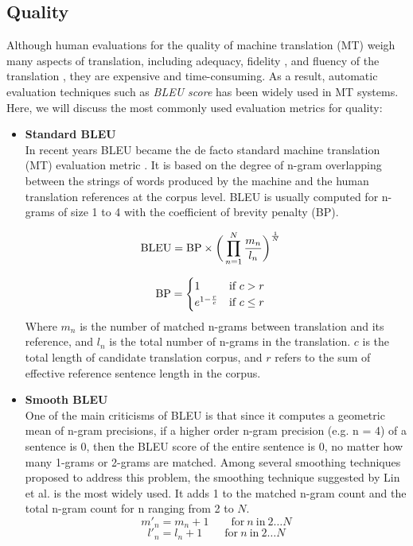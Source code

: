 \documentclass{sfuthesis}
\begin{document}
\subsection{Quality} \label{subsec:quality}
Although human evaluations for the quality of machine translation (MT) weigh many aspects of translation, including adequacy, fidelity , and fluency of the translation \cite{hovy:1999:toward}, they are expensive and time-consuming. As a result, automatic evaluation techniques such as \emph{BLEU score} \cite{Papineni:2002:ACL} has been widely used in MT systems. Here, we will discuss the most commonly used evaluation metrics for quality:\\
\begin{itemize}
    \item \textbf{ Standard BLEU}\\
    In recent years BLEU became the de facto standard machine translation (MT) evaluation metric \cite{chen:2014:ACL}. It is based on the degree of n-gram overlapping between the strings of words produced by the machine and the human translation references at the corpus level. BLEU is usually computed for n-grams of size 1 to 4 with the coefficient of brevity penalty (BP).

\begin{align*}
\centering
\text{BLEU} &= \text{BP} \times \bigg( \prod_{n=1}^{N} \frac{m_n}{l_n} \bigg)^\frac{1}{N}
\end{align*}

\begin{align*}
\centering
\text{BP} &= 
\begin{cases}
1 & \text{if} \ c>r\\
e^{1-\frac{r}{c}} & \text{if} \ c\leq r
\end{cases}
\end{align*}
Where $m_n$ is the number of matched n-grams between
translation and its reference, and $l_n$ is the total number of n-grams in the translation. $c$ is the total length of candidate translation corpus, and $r$ refers to the sum of effective reference sentence length in the corpus.

    \item \textbf{ Smooth BLEU}\\
    One of the main criticisms of BLEU is that since it computes a geometric mean of n-gram precisions, if a higher order n-gram precision (e.g. n = 4) of a sentence is 0, then the BLEU score of the entire sentence is 0, no matter how many 1-grams or 2-grams are matched. Among several smoothing techniques proposed to address this problem, the smoothing technique suggested by Lin et al. \cite{Lin:2004:ACL} is the most widely used. It adds 1 to the matched n-gram count and the total n-gram count for n ranging from 2 to $N$.
    $$m'_n = m_n + 1 \qquad \text{for}\ n\ \text{in}\ 2 \dots N$$
    $$l'_n = l_n + 1 \qquad \text{for}\ n\ \text{in}\ 2 \dots N$$
\end{itemize}
\end{document}
